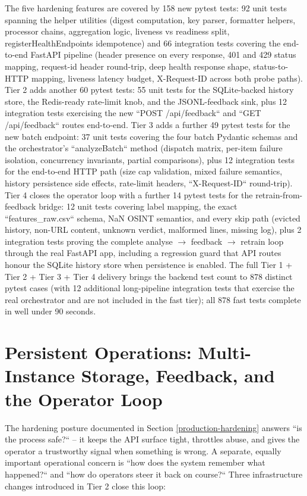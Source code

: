 The five hardening features are covered by 158 new pytest tests: 92 unit tests spanning the helper utilities (digest computation, key parser, formatter helpers, processor chains, aggregation logic, liveness vs readiness split, registerHealthEndpoints idempotence) and 66 integration tests covering the end-to-end FastAPI pipeline (header presence on every response, 401 and 429 status mapping, request-id header round-trip, deep health response shape, status-to-HTTP mapping, liveness latency budget, X-Request-ID across both probe paths). Tier 2 adds another 60 pytest tests: 55 unit tests for the SQLite-backed history store, the Redis-ready rate-limit knob, and the JSONL-feedback sink, plus 12 integration tests exercising the new ``POST /api/feedback`` and ``GET /api/feedback`` routes end-to-end. Tier 3 adds a further 49 pytest tests for the new batch endpoint: 37 unit tests covering the four batch Pydantic schemas and the orchestrator's ``analyzeBatch`` method (dispatch matrix, per-item failure isolation, concurrency invariants, partial comparisons), plus 12 integration tests for the end-to-end HTTP path (size cap validation, mixed failure semantics, history persistence side effects, rate-limit headers, ``X-Request-ID`` round-trip). Tier 4 closes the operator loop with a further 14 pytest tests for the retrain-from-feedback bridge: 12 unit tests covering label mapping, the exact ``features\_raw.csv`` schema, NaN OSINT semantics, and every skip path (evicted history, non-URL content, unknown verdict, malformed lines, missing log), plus 2 integration tests proving the complete analyse $\rightarrow$ feedback $\rightarrow$ retrain loop through the real FastAPI app, including a regression guard that API routes honour the SQLite history store when persistence is enabled. The full Tier 1 + Tier 2 + Tier 3 + Tier 4 delivery brings the backend test count to 878 distinct pytest cases (with 12 additional long-pipeline integration tests that exercise the real orchestrator and are not included in the fast tier); all 878 fast tests complete in well under 90 seconds.

\section{Persistent Operations: Multi-Instance Storage, Feedback, and the Operator Loop}\label{persistent-operations}

The hardening posture documented in Section \ref{production-hardening} answers ``is the process safe?`` -- it keeps the API surface tight, throttles abuse, and gives the operator a trustworthy signal when something is wrong. A separate, equally important operational concern is ``how does the system remember what happened?`` and ``how do operators steer it back on course?`` Three infrastructure changes introduced in Tier 2 close this loop:

